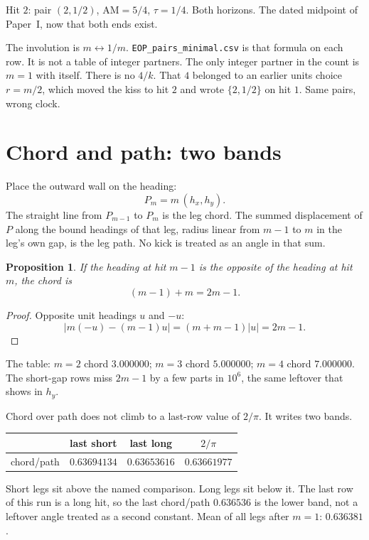 \documentclass[10pt,a4paper]{article}
\theoremstyle{plain}
\newtheorem{proposition}{Proposition}
\theoremstyle{definition}
\theoremstyle{remark}
\begin{document}
Hit \(2\): pair \((2,1/2)\), \(\mathrm{AM}=5/4\), \(\tau=1/4\).
Both horizons.
The dated midpoint of Paper~I, now that both ends exist.

The involution is \(m\leftrightarrow 1/m\).
\texttt{EOP\_pairs\_minimal.csv} is that formula on each row.
It is not a table of integer partners.
The only integer partner in the count is \(m=1\) with itself.
There is no \(4/k\).
That \(4\) belonged to an earlier units choice \(r=m/2\), which moved the kiss to hit \(2\) and wrote \(\{2,1/2\}\) on hit \(1\).
Same pairs, wrong clock.

\section{Chord and path: two bands}

Place the outward wall on the heading:
\[
P_m=m\,(h_x,h_y).
\]
The straight line from \(P_{m-1}\) to \(P_m\) is the leg chord.
The summed displacement of \(P\) along the bound headings of that leg, radius linear from \(m-1\) to \(m\) in the leg's own gap, is the leg path.
No kick is treated as an angle in that sum.

\begin{proposition}
If the heading at hit \(m-1\) is the opposite of the heading at hit \(m\), the chord is
\[
(m-1)+m=2m-1.
\]
\end{proposition}

\begin{proof}
Opposite unit headings \(u\) and \(-u\):
\[
\bigl|m(-u)-(m-1)u\bigr|=(m+m-1)|u|=2m-1.
\]
\end{proof}

The table: \(m=2\) chord \(3.000000\); \(m=3\) chord \(5.000000\); \(m=4\) chord \(7.000000\).
The short-gap rows miss \(2m-1\) by a few parts in \(10^{6}\), the same leftover that shows in \(h_y\).

Chord over path does not climb to a last-row value of \(2/\pi\).
It writes two bands.

\begin{center}
\begin{tabular}{@{}lccc@{}}
\toprule
 & last short & last long & \(2/\pi\) \\
\midrule
chord/path & \(0.63694134\) & \(0.63653616\) & \(0.63661977\) \\
\bottomrule
\end{tabular}
\end{center}

Short legs sit above the named comparison.
Long legs sit below it.
The last row of this run is a long hit, so the last chord/path \(0.636536\) is the lower band, not a leftover angle treated as a second constant.
Mean of all legs after \(m=1\): \(0.636381\).
\end{document}
